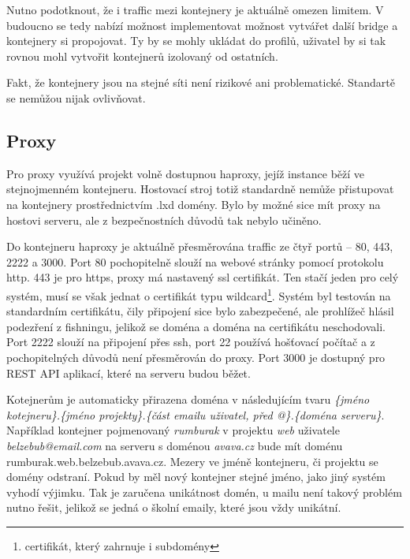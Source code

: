 \documentclass[a4paper,oneside,12pt]{report}
\begin{document}
Nutno podotknout, že i traffic mezi kontejnery je aktuálně omezen limitem.
V budoucno se tedy nabízí možnost implementovat možnost vytvářet další bridge a kontejnery si propojovat.
Ty by se mohly ukládat do profilů, uživatel by si tak rovnou mohl vytvořit kontejnerů izolovaný od ostatních.

Fakt, že kontejnery jsou na stejné síti není rizikové ani problematické.
Standartě se nemůžou nijak ovlivňovat.

\subsection{Proxy}

Pro proxy využívá projekt volně dostupnou haproxy, jejíž instance běží ve stejnojmenném kontejneru.
Hostovací stroj totiž standardně nemůže přistupovat na kontejnery prostřednictvím .lxd domény.
Bylo by možné sice mít proxy na hostovi serveru, ale z bezpečnostních důvodů tak nebylo učiněno.

Do kontejneru haproxy je aktuálně přesměrována traffic ze čtyř portů -- 80, 443, 2222 a 3000.
Port 80 pochopitelně slouží na webové stránky pomocí protokolu http.
443 je pro https, proxy má nastavený ssl certifikát.
Ten stačí jeden pro celý systém, musí se však jednat o certifikát typu wildcard\footnote{certifikát, který zahrnuje i subdomény}.
Systém byl testován na standardním certifikátu, čily připojení sice bylo zabezpečené, ale prohlížeč hlásil podezření z fishningu, jelikož se doména a doména na certifikátu neschodovali.
Port 2222 slouží na připojení přes ssh, port 22 používá hošťovací počítač a z pochopitelných důvodů není přesměrován do proxy.
Port 3000 je dostupný pro REST API aplikací, které na serveru budou běžet.

Kotejnerům je automaticky přirazena doména v následujícím tvaru \textit{\{jméno kotejneru\}.\{jméno projekty\}.\{část emailu uživatel, před @\}.\{doména serveru\}}.
Například kontejner pojmenovaný \textit{rumburak} v projektu \textit{web} uživatele \textit{belzebub@email.com} na serveru s doménou \textit{avava.cz} bude mít doménu {rumburak.web.belzebub.avava.cz}.
Mezery ve jméně kontejneru, či projektu se domény odstraní.
Pokud by měl nový kontejner stejné jméno, jako jiný systém vyhodí výjimku.
Tak je zaručena unikátnost domén, u mailu není takový problém nutno řešit, jelikož se jedná o školní emaily, které jsou vždy unikátní.
\end{document}
